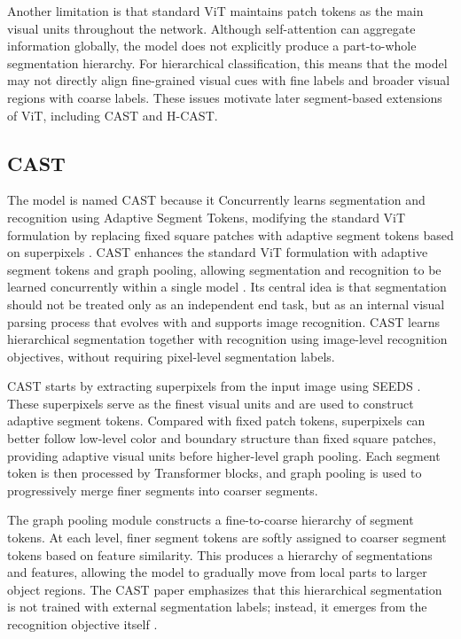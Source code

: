 Another limitation is that standard ViT maintains patch tokens as the main visual units throughout the network. Although self-attention can aggregate information globally, the model does not explicitly produce a part-to-whole segmentation hierarchy. For hierarchical classification, this means that the model may not directly align fine-grained visual cues with fine labels and broader visual regions with coarse labels. These issues motivate later segment-based extensions of ViT, including CAST and H-CAST.


\subsection{CAST}

The model is named CAST because it Concurrently learns segmentation and recognition using Adaptive Segment Tokens, modifying the standard ViT formulation by replacing fixed square patches with adaptive segment tokens based on superpixels \cite{ke2024learning}. CAST enhances the standard ViT formulation with adaptive segment tokens and graph pooling, allowing segmentation and recognition to be learned concurrently within a single model \cite{ke2024learning}. Its central idea is that segmentation should not be treated only as an independent end task, but as an internal visual parsing process that evolves with and supports image recognition. CAST learns hierarchical segmentation together with recognition using image-level recognition objectives, without requiring pixel-level segmentation labels.

CAST starts by extracting superpixels from the input image using SEEDS \cite{van2015seeds}. These superpixels serve as the finest visual units and are used to construct adaptive segment tokens. Compared with fixed patch tokens, superpixels can better follow low-level color and boundary structure than fixed square patches, providing adaptive visual units before higher-level graph pooling. Each segment token is then processed by Transformer blocks, and graph pooling is used to progressively merge finer segments into coarser segments.

The graph pooling module constructs a fine-to-coarse hierarchy of segment tokens. At each level, finer segment tokens are softly assigned to coarser segment tokens based on feature similarity. This produces a hierarchy of segmentations and features, allowing the model to gradually move from local parts to larger object regions. The CAST paper emphasizes that this hierarchical segmentation is not trained with external segmentation labels; instead, it emerges from the recognition objective itself \cite{ke2024learning}.

